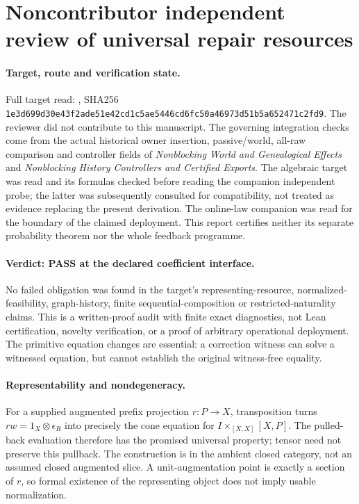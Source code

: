 \documentclass{article}
\begin{document}
\section*{Noncontributor independent review of universal repair resources}
\paragraph{Target, route and verification state.}
Full target read: , SHA256
\texttt{1e3d699d30e43f2ade51e42cd1c5ae5446cd6fc50a46973d51b5a652471c2fd9}.
The reviewer did not contribute to this manuscript. The governing integration checks come from the actual historical owner insertion, passive/world, all-raw comparison and controller fields of \emph{Nonblocking World and Genealogical Effects} and \emph{Nonblocking History Controllers and Certified Exports}. The algebraic target was read and its formulas checked before reading the companion independent probe; the latter was subsequently consulted for compatibility, not treated as evidence replacing the present derivation. The online-law companion was read for the boundary of the claimed deployment. This report certifies neither its separate probability theorem nor the whole feedback programme.

\paragraph{Verdict: PASS at the declared coefficient interface.}
No failed obligation was found in the target's representing-resource, normalized-feasibility, graph-history, finite sequential-composition or restricted-naturality claims. This is a written-proof audit with finite exact diagnostics, not Lean certification, novelty verification, or a proof of arbitrary operational deployment. The primitive equation changes are essential: a correction witness can solve a witnessed equation, but cannot establish the original witness-free equality.

\paragraph{Representability and nondegeneracy.}
For a supplied augmented prefix projection $r:P\to X$, transposition turns $rw=1_X\otimes\epsilon_R$ into precisely the cone equation for $I\times_{[X,X]}[X,P]$. The pulled-back evaluation therefore has the promised universal property; tensor need not preserve this pullback. The construction is in the ambient closed category, not an assumed closed augmented slice. A unit-augmentation point is exactly a section of $r$, so formal existence of the representing object does not imply usable normalization.
\end{document}
